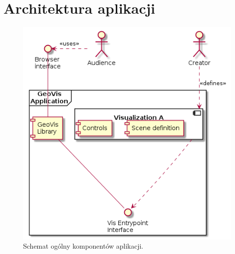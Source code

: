 \chapter{Architektura aplikacji}


\begin{figure}
    \centering
    \includegraphics[width=0.5\linewidth]{diagrams/out/helicopter_view}
    \caption{Schemat ogólny komponentów aplikacji.}
    \label{uml:helicopter}
\end{figure}
